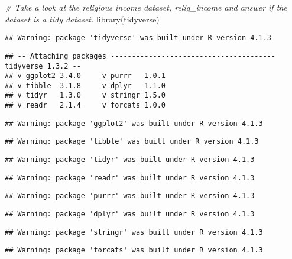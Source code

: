 \documentclass[
]{article}
\newenvironment{Shaded}{\begin{snugshade}}{\end{snugshade}}
\newcommand{\CommentTok}[1]{\textcolor[rgb]{0.56,0.35,0.01}{\textit{#1}}}
\newcommand{\FunctionTok}[1]{\textcolor[rgb]{0.00,0.00,0.00}{#1}}
\newcommand{\NormalTok}[1]{#1}
\begin{document}
\begin{Shaded}
\begin{Highlighting}[]
\CommentTok{\# Take a look at the religious income dataset, relig\_income and answer if the dataset is a tidy dataset.}
\FunctionTok{library}\NormalTok{(tidyverse)}
\end{Highlighting}
\end{Shaded}

\begin{verbatim}
## Warning: package 'tidyverse' was built under R version 4.1.3
\end{verbatim}

\begin{verbatim}
## -- Attaching packages --------------------------------------- tidyverse 1.3.2 --
## v ggplot2 3.4.0     v purrr   1.0.1
## v tibble  3.1.8     v dplyr   1.1.0
## v tidyr   1.3.0     v stringr 1.5.0
## v readr   2.1.4     v forcats 1.0.0
\end{verbatim}

\begin{verbatim}
## Warning: package 'ggplot2' was built under R version 4.1.3
\end{verbatim}

\begin{verbatim}
## Warning: package 'tibble' was built under R version 4.1.3
\end{verbatim}

\begin{verbatim}
## Warning: package 'tidyr' was built under R version 4.1.3
\end{verbatim}

\begin{verbatim}
## Warning: package 'readr' was built under R version 4.1.3
\end{verbatim}

\begin{verbatim}
## Warning: package 'purrr' was built under R version 4.1.3
\end{verbatim}

\begin{verbatim}
## Warning: package 'dplyr' was built under R version 4.1.3
\end{verbatim}

\begin{verbatim}
## Warning: package 'stringr' was built under R version 4.1.3
\end{verbatim}

\begin{verbatim}
## Warning: package 'forcats' was built under R version 4.1.3
\end{verbatim}
\end{document}
